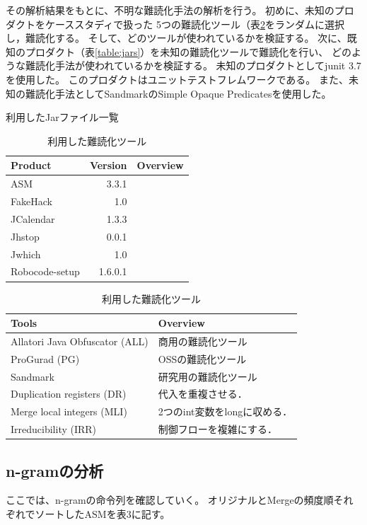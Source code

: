 \documentclass[a4j,fleqn,10pt]{jarticle}
\begin{document}
その解析結果をもとに、不明な難読化手法の解析を行う。
初めに、未知のプロダクトをケーススタディで扱った
5つの難読化ツール（表\ref{table:tools}をランダムに選択し，難読化する。
そして、どのツールが使われているかを検証する。
次に、既知のプロダクト（表\ref{table:jars}）を未知の難読化ツールで難読化を行い、
どのような難読化手法が使われているかを検証する。
未知のプロダクトとしてjunit 3.7を使用した。
このプロダクトはユニットテストフレムワークである。
また、未知の難読化手法としてSandmarkのSimple Opaque Predicatesを使用した。

\begin{table}[t]
  \centering
  \footnotesize{
    \caption{利用したJarファイル一覧}\label{table:jars}
  \begin{tabular}{l|r|p{3.5cm}}
    Product & Version & Overview \\ \hline
    ASM       & 3.3.1 & \\
    FakeHack  & 1.0   & \\
    JCalendar & 1.3.3 & \\
    Jhstop    & 0.0.1 & \\
    Jwhich    & 1.0   & \\
    Robocode-setup & 1.6.0.1 & \\
  \end{tabular}
  \caption{利用した難読化ツール}\label{table:tools}
  \begin{tabular}{l|l}
      Tools & Overview \\ \hline
      Allatori Java Obfuscator (ALL) & 商用の難読化ツール \\ \hline
      ProGurad                 (PG) & OSSの難読化ツール \\ \hline
      Sandmark                 & 研究用の難読化ツール \\
      \hspace{0.2cm} Duplication registers (DR) & 代入を重複させる．\\
      \hspace{0.2cm} Merge local integers (MLI) & 2つのint変数をlongに収める．\\
      \hspace{0.2cm} Irreducibility       (IRR) & 制御フローを複雑にする．\\
  \end{tabular}}
\end{table}

\subsection{n-gramの分析}
ここでは、n-gramの命令列を確認していく。
オリジナルとMergeの頻度順それぞれでソートしたASMを表3に記す。
\end{document}

